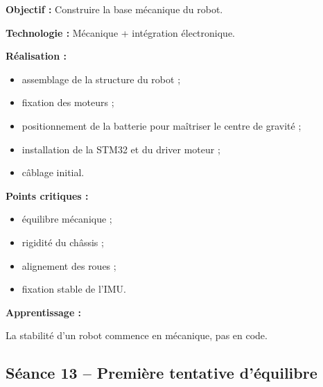 \documentclass[11pt,a4paper]{article}
\begin{document}
	\begin{sessionbox}
		
		\textbf{Objectif :} Construire la base mécanique du robot.
		
		\vspace{0.3cm}
		
		\textbf{Technologie :} Mécanique + intégration électronique.
		
		\vspace{0.3cm}
		
		\textbf{Réalisation :}
		
		\begin{itemize}
			\item assemblage de la structure du robot ;
			\item fixation des moteurs ;
			\item positionnement de la batterie pour maîtriser le centre de gravité ;
			\item installation de la STM32 et du driver moteur ;
			\item câblage initial.
		\end{itemize}
		
		\vspace{0.3cm}
		
		\textbf{Points critiques :}
		
		\begin{itemize}
			\item équilibre mécanique ;
			\item rigidité du châssis ;
			\item alignement des roues ;
			\item fixation stable de l'IMU.
		\end{itemize}
		
		\vspace{0.3cm}
		
		\textbf{Apprentissage :}
		
		La stabilité d'un robot commence en mécanique, pas en code.
		
	\end{sessionbox}
	
	\subsection*{Séance 13 -- Première tentative d'équilibre}
	
\end{document}
